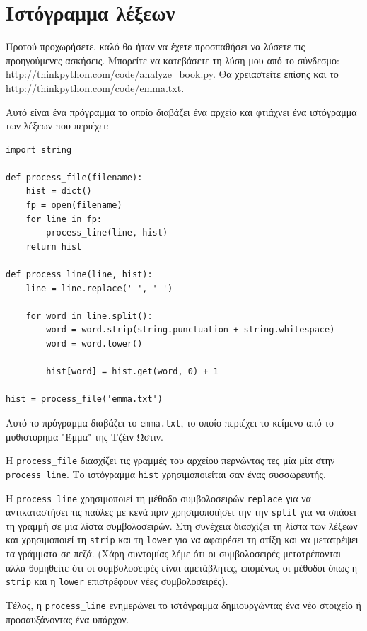 \documentclass[10pt]{book}
\begin{document}
\section{Ιστόγραμμα λέξεων}

Προτού προχωρήσετε, καλό θα ήταν να έχετε προσπαθήσει να λύσετε τις προηγούμενες ασκήσεις. Μπορείτε να κατεβάσετε τη λύση μου από το σύνδεσμο: \url{http://thinkpython.com/code/analyze_book.py}. Θα χρειαστείτε επίσης και το \url{http://thinkpython.com/code/emma.txt}.

Αυτό είναι ένα πρόγραμμα το οποίο διαβάζει ένα αρχείο και φτιάχνει ένα ιστόγραμμα των λέξεων που περιέχει:

\begin{verbatim}
import string

def process_file(filename):
    hist = dict()
    fp = open(filename)
    for line in fp:
        process_line(line, hist)
    return hist

def process_line(line, hist):
    line = line.replace('-', ' ')

    for word in line.split():
        word = word.strip(string.punctuation + string.whitespace)
        word = word.lower()

        hist[word] = hist.get(word, 0) + 1

hist = process_file('emma.txt')
\end{verbatim}
%
Αυτό το πρόγραμμα διαβάζει το {\tt emma.txt}, το οποίο περιέχει το κείμενο από το μυθιστόρημα "Έμμα" της Τζέιν Ώστιν.

Η \verb"process_file" διασχίζει τις γραμμές του αρχείου περνώντας τες μία μία στην \verb"process_line". Το ιστόγραμμα {\tt hist} χρησιμοποιείται σαν ένας συσσωρευτής.

Η \verb"process_line" χρησιμοποιεί τη μέθοδο συμβολοσειρών {\tt replace} για να αντικαταστήσει τις παύλες με κενά πριν χρησιμοποιήσει την την {\tt split} για να σπάσει τη γραμμή σε μία λίστα συμβολοσειρών. Στη συνέχεια  διασχίζει τη λίστα των λέξεων και χρησιμοποιεί τη {\tt strip} και τη {\tt lower} για να αφαιρέσει τη στίξη και να μετατρέψει τα γράμματα σε πεζά. (Χάρη συντομίας λέμε ότι οι συμβολοσειρές μετατρέπονται αλλά θυμηθείτε ότι οι συμβολοσειρές είναι αμετάβλητες, επομένως οι μέθοδοι όπως η {\tt strip} και η {\tt lower} επιστρέφουν νέες συμβολοσειρές).

Τέλος, η \verb"process_line" ενημερώνει το ιστόγραμμα δημιουργώντας ένα νέο στοιχείο ή προσαυξάνοντας ένα υπάρχον.
\end{document}
